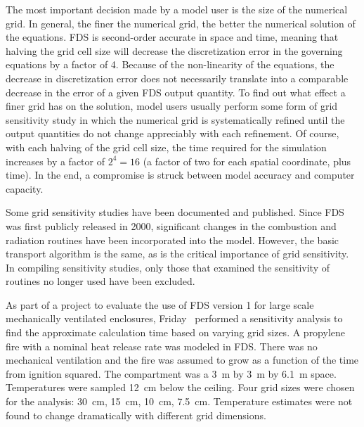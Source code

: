 \documentclass[11pt]{book}
\begin{document}
\label{gridsen}

The most  important decision made by a  model user is the  size of the
numerical grid. In  general, the finer the numerical  grid, the better
the numerical solution of  the equations. FDS is second-order accurate
in  space and  time,  meaning that  halving  the grid  cell size  will
decrease  the discretization  error in  the governing  equations  by a
factor  of 4.  Because  of  the non-linearity  of  the equations,  the
decrease in discretization error does not necessarily translate into a
comparable decrease  in the error of  a given FDS  output quantity. To
find out  what effect a  finer grid has  on the solution,  model users
usually  perform some  form of  grid  sensitivity study  in which  the
numerical grid  is systematically refined until  the output quantities
do not change  appreciably with each refinement. Of  course, with each
halving of  the grid cell size,  the time required  for the simulation
increases by  a factor of $2^4=16$  (a factor of two  for each spatial
coordinate, plus  time). In  the end, a  compromise is  struck between
model accuracy and computer capacity.

Some   grid    sensitivity   studies   have    been   documented   and
published. Since FDS was  first publicly released in 2000, significant
changes   in  the   combustion  and   radiation  routines   have  been
incorporated into the model. However, the basic transport algorithm is
the  same, as  is  the  critical importance  of  grid sensitivity.  In
compiling   sensitivity  studies,   only  those   that   examined  the
sensitivity of routines no longer used have been excluded.

As part of  a project to evaluate  the use of FDS version  1 for large
scale   mechanically  ventilated   enclosures,  Friday~\cite{Friday:1}
performed a  sensitivity analysis to find  the approximate calculation
time based on varying grid sizes. A propylene fire with a nominal heat
release rate was  modeled in FDS. There was  no mechanical ventilation
and  the fire  was assumed  to grow  as a  function of  the  time from
ignition  squared.  The  compartment  was   a  3~m  by  3~m  by  6.1~m
space. Temperatures  were sampled 12~cm  below the ceiling.  Four grid
sizes   were   chosen  for   the   analysis:   30~cm,  15~cm,   10~cm,
7.5~cm. Temperature  estimates were  not found to  change dramatically
with different grid dimensions.
\end{document}
